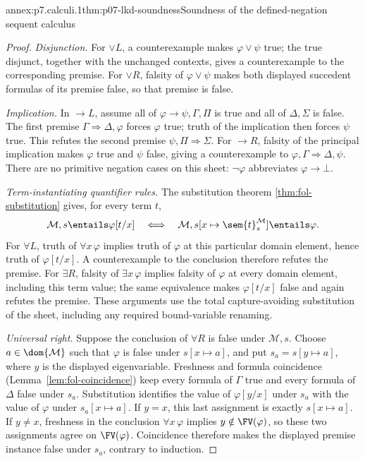\begin{annexitem}{annex:p7.calculi.1}{thm:p07-lkd-soundness}{Soundness of the defined-negation sequent calculus}
\begin{proof}
\emph{Disjunction.} For \(\lor L\), a counterexample makes
\(\varphi\lor\psi\) true; the true disjunct, together with the unchanged
contexts, gives a counterexample to the corresponding premise.  For
\(\lor R\), falsity of \(\varphi\lor\psi\) makes both displayed
succedent formulas of its premise false, so that premise is false.

\emph{Implication.} In \(\to L\), assume all of
\(\varphi\to\psi,\Gamma,\Pi\) is true and all of
\(\Delta,\Sigma\) is false.  The first premise
\(\Gamma\Rightarrow\Delta,\varphi\) forces \(\varphi\) true; truth
of the implication then forces \(\psi\) true.  This refutes the second
premise \(\psi,\Pi\Rightarrow\Sigma\).  For \(\to R\), falsity of
the principal implication makes \(\varphi\) true and \(\psi\) false,
giving a counterexample to
\(\varphi,\Gamma\Rightarrow\Delta,\psi\).  There are no primitive
negation cases on this sheet: \(\neg\varphi\) abbreviates
\(\varphi\to\bot\).

\emph{Term-instantiating quantifier rules.} The substitution theorem
\ref{thm:fol-substitution} gives, for every term \(t\),
\[
 \mathcal M,s\entails\varphi[t/x]
 \quad\Longleftrightarrow\quad
 \mathcal M,s[x\mapsto\sem{t}^{\mathcal M}_s]\entails\varphi.
\]
For \(\forall L\), truth of \(\forall x\,\varphi\) implies truth of
\(\varphi\) at this particular domain element, hence truth of
\(\varphi[t/x]\).  A counterexample to the conclusion therefore refutes
the premise.  For \(\exists R\), falsity of \(\exists x\,\varphi\)
implies falsity of \(\varphi\) at every domain element, including this
term value; the same equivalence makes \(\varphi[t/x]\) false and again
refutes the premise.  These arguments use the total capture-avoiding
substitution of the sheet, including any required bound-variable renaming.

\emph{Universal right.} Suppose the conclusion of \(\forall R\) is
false under \(\mathcal M,s\).  Choose \(a\in\dom{\mathcal M}\) such
that \(\varphi\) is false under \(s[x\mapsto a]\), and put
\(s_a=s[y\mapsto a]\), where \(y\) is the displayed eigenvariable.
Freshness and formula coincidence (Lemma~\ref{lem:fol-coincidence}) keep
every formula of \(\Gamma\) true and every formula of \(\Delta\)
false under \(s_a\).  Substitution identifies the value of
\(\varphi[y/x]\) under \(s_a\) with the value of \(\varphi\) under
\(s_a[x\mapsto a]\).  If \(y=x\), this last assignment is exactly
\(s[x\mapsto a]\).  If \(y\ne x\), freshness in the conclusion
\(\forall x\,\varphi\) implies \(y\notin\FV(\varphi)\), so these
two assignments agree on \(\FV(\varphi)\).  Coincidence therefore makes
the displayed premise instance false under \(s_a\), contrary to induction.


\end{proof}
\end{annexitem}
